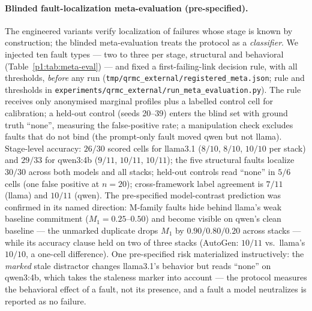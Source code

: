 \documentclass{article}
\begin{document}
\paragraph{Blinded fault-localization meta-evaluation (pre-specified).}
The engineered variants verify localization of failures whose stage
is known by construction; the blinded meta-evaluation treats the protocol
as a \emph{classifier}. We injected ten fault types --- two to three
per stage, structural and behavioral (Table~\ref{p1:tab:meta-eval}) ---
and fixed a first-failing-link decision rule, with all thresholds,
\emph{before} any run (\texttt{tmp/qrmc\_external/registered\_meta.json};
rule and thresholds in
\texttt{experiments/qrmc\_external/run\_meta\_evaluation.py}). The
rule receives only anonymised marginal profiles plus a labelled
control cell for calibration; a held-out control (seeds 20--39)
enters the blind set with ground truth ``none'', measuring the
false-positive rate; a manipulation check excludes faults that do not
bind (the prompt-only fault moved qwen but not llama). Stage-level
accuracy: $26/30$ scored cells for llama3.1 ($8/10$, $8/10$, $10/10$
per stack) and $29/33$ for qwen3:4b ($9/11$, $10/11$, $10/11$); the
five structural faults localize $30/30$ across both models and all
stacks; held-out controls read ``none'' in $5/6$ cells (one false
positive at $n{=}20$); cross-framework label agreement is $7/11$
(llama) and $10/11$ (qwen). The pre-specified model-contrast prediction
was confirmed in its named direction: M-family faults hide behind
llama's weak baseline commitment ($M_1{=}0.25$--$0.50$) and become
visible on qwen's clean baseline --- the unmarked duplicate drops
$M_1$ by $0.90/0.80/0.20$ across stacks --- while its accuracy clause
held on two of three stacks (AutoGen: $10/11$ vs.\ llama's $10/10$,
a one-cell difference). One pre-specified risk materialized
instructively: the \emph{marked} stale distractor changes llama3.1's behavior but
reads ``none'' on qwen3:4b, which takes the staleness marker into
account --- the protocol measures the behavioral effect of a fault,
not its presence, and a fault a model neutralizes is reported as no
failure.
\end{document}
